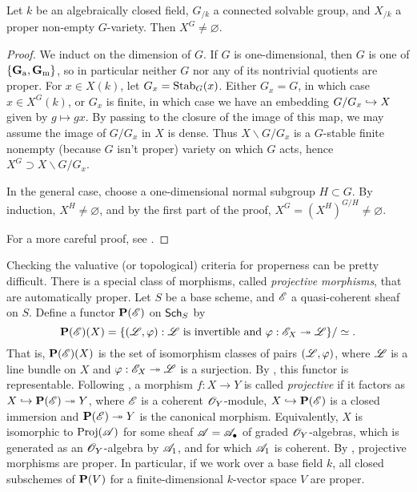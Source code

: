 \begin{theorem}\label{thm:borel-fixed}
Let $k$ be an algebraically closed field, $G_{/k}$ a connected solvable group, 
and $X_{/k}$ a proper non-empty $G$-variety. Then $X^G\ne\varnothing$. 
\end{theorem}
\begin{proof}
We induct on the dimension of $G$. If $G$ is one-dimensional, then 
$G$ is one of $\{\mathbf{G}_\mathrm{a},\mathbf{G}_\mathrm{m}\}$, so in particular neither $G$ nor any of its 
nontrivial quotients are proper. For $x\in X(k)$, let 
$G_x=\operatorname{Stab}_G(x)$. Either $G_x=G$, in which case $x\in X^G(k)$, or 
$G_x$ is finite, in which case we have an embedding $G/G_x\hookrightarrow X$ given 
by $g\mapsto g x$. By passing to the closure of the image of this map, 
we may assume the image of $G/G_x$ in $X$ is dense. Thus 
$X\smallsetminus G/G_x$ is a $G$-stable finite nonempty (because $G$ 
isn't proper) variety on which $G$ acts, hence 
$X^G\supset X\smallsetminus G/G_x$. 

In the general case, choose a one-dimensional normal subgroup 
$H\subset G$. By induction, $X^H\ne\varnothing$, and by the first part of 
the proof, $X^G=(X^H)^{G/H}\ne\varnothing$. 

For a more careful proof, see \cite[18.1]{milne-iAG}. 
\end{proof}

Checking the valuative (or topological) criteria for properness can be pretty 
difficult. There is a special class of morphisms, called \emph{projective 
morphisms}, that are automatically proper. Let $S$ be a base scheme, and 
$\mathscr{E}$ a quasi-coherent sheaf on $S$. Define a functor $\mathbf{P}(\mathscr{E})$ on 
$\mathsf{Sch}_{S}$ by 
\[
  \mathbf{P}(\mathscr{E})(X) = \{(\mathscr{L},\varphi):\text{$\mathscr{L}$ is invertible and }\varphi:\mathscr{E}_X\twoheadrightarrow \mathscr{L}\} /\simeq .
\]
That is, $\mathbf{P}(\mathscr{E})(X)$ is the set of isomorphism classes of pairs 
$(\mathscr{L},\varphi)$, where $\mathscr{L}$ is a line bundle on $X$ and 
$\varphi:\mathscr{E}_X\twoheadrightarrow \mathscr{L}$ is a surjection. By \cite[II 4.2.3]{ega2}, this 
functor is representable. Following \cite[II 5.5.2]{ega2}, a morphism 
$f:X\to Y$ is called \emph{projective} if it factors as 
$X\hookrightarrow \mathbf{P}(\mathscr{E})\twoheadrightarrow Y$, where $\mathscr{E}$ is a coherent $\mathscr{O}_Y$-module, 
$X\hookrightarrow \mathbf{P}(\mathscr{E})$ is a closed immersion and $\mathbf{P}(\mathscr{E})\twoheadrightarrow Y$ is the 
canonical morphism. Equivalently, $X$ is isomorphic to $\operatorname{Proj}(\mathscr{A})$ for 
some sheaf $\mathscr{A}=\mathscr{A}_\bullet$ of graded $\mathscr{O}_Y$-algebras, which is 
generated as an $\mathscr{O}_Y$-algebra by $\mathscr{A}_1$, and for which $\mathscr{A}_1$ is coherent. 
By \cite[II 5.5.3]{ega2}, projective morphisms are proper. In particular, 
if we work over a base field $k$, all closed subschemes of 
$\mathbf{P}(V)$ for a finite-dimensional $k$-vector space $V$ are proper. 





